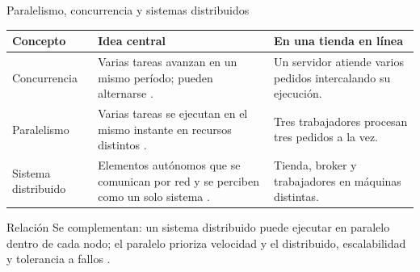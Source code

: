 \begin{frame}{Paralelismo, concurrencia y sistemas distribuidos}
  \small
  \begin{tabularx}{\textwidth}{@{}p{2.6cm}XX@{}}
    \toprule
    \textbf{Concepto} & \textbf{Idea central} & \textbf{En una tienda en línea} \\
    \midrule
    Concurrencia &
      Varias tareas avanzan en un mismo período; pueden alternarse
      \cite{reinders2023}. &
      Un servidor atiende varios pedidos intercalando su ejecución. \\
    Paralelismo &
      Varias tareas se ejecutan en el mismo instante en recursos distintos
      \cite{reinders2023,dai2025parallel}. &
      Tres trabajadores procesan tres pedidos a la vez. \\
    \raggedright Sistema distribuido &
      Elementos autónomos que se comunican por red y se perciben como un
      solo sistema \cite{vansteen2023distributed}. &
      Tienda, broker y trabajadores en máquinas distintas. \\
    \bottomrule
  \end{tabularx}

  \vspace{0.3cm}
  \begin{block}{Relación}
    Se complementan: un sistema distribuido puede ejecutar en paralelo dentro
    de cada nodo; el paralelo prioriza velocidad y el distribuido,
    escalabilidad y tolerancia a fallos \cite{dai2025parallel}.
  \end{block}
\end{frame}

